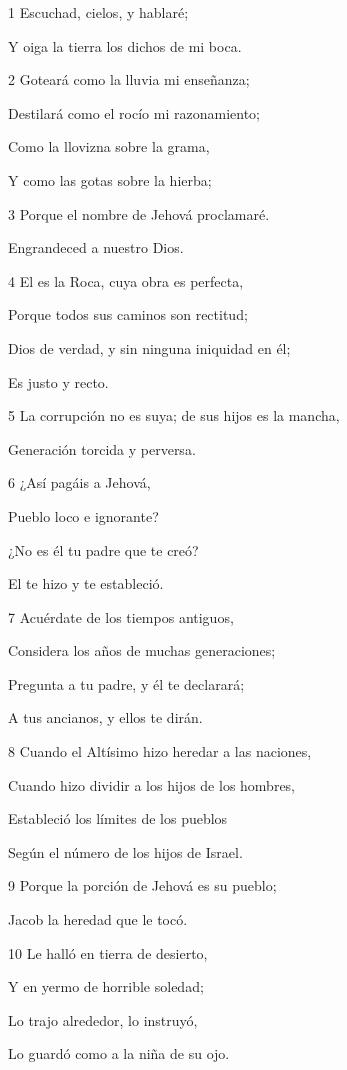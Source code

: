 \par 1 Escuchad, cielos, y hablaré;
\par Y oiga la tierra los dichos de mi boca. 
\par 2 Goteará como la lluvia mi enseñanza; 
\par Destilará como el rocío mi razonamiento;
\par Como la llovizna sobre la grama,
\par Y como las gotas sobre la hierba;
\par 3 Porque el nombre de Jehová proclamaré.
\par Engrandeced a nuestro Dios.
\par 4 El es la Roca, cuya obra es perfecta,
\par Porque todos sus caminos son rectitud;
\par Dios de verdad, y sin ninguna iniquidad en él;
\par Es justo y recto.
\par 5 La corrupción no es suya; de sus hijos es la mancha,
\par Generación torcida y perversa.
\par 6 ¿Así pagáis a Jehová,
\par Pueblo loco e ignorante?
\par ¿No es él tu padre que te creó?
\par El te hizo y te estableció.
\par 7 Acuérdate de los tiempos antiguos,
\par Considera los años de muchas generaciones;
\par Pregunta a tu padre, y él te declarará;
\par A tus ancianos, y ellos te dirán. 
\par 8 Cuando el Altísimo hizo heredar a las naciones,
\par Cuando hizo dividir a los hijos de los hombres,
\par Estableció los límites de los pueblos
\par Según el número de los hijos de Israel.
\par 9 Porque la porción de Jehová es su pueblo;
\par Jacob la heredad que le tocó.
\par 10 Le halló en tierra de desierto,
\par Y en yermo de horrible soledad;
\par Lo trajo alrededor, lo instruyó,
\par Lo guardó como a la niña de su ojo.
